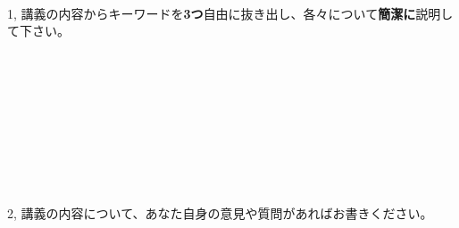 \documentclass[a4paper,10pt,fleqn]{jsarticle}
\begin{document}
 \\


1, 講義の内容からキーワードを\textbf{3つ}自由に抜き出し、各々について\textbf{簡潔に}説明して下さい。
\begin{screen}
　　\\
　　\\
　　\\
　　\\
　　\\
　　\\
　　\\
\end{screen} \\

2, 講義の内容について、あなた自身の意見や質問があればお書きください。
\begin{screen}
　　\\
　　\\
　　\\
　　\\
\end{screen}
\end{document}
